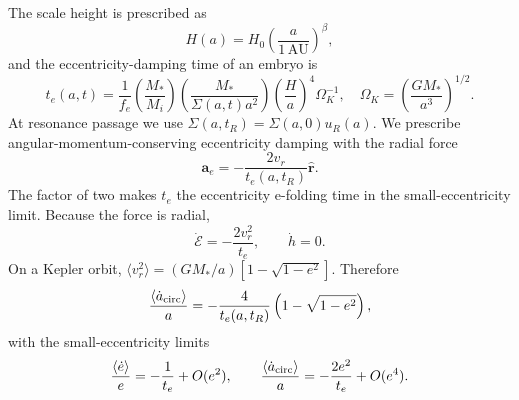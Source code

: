 The scale height is prescribed as
\begin{equation}
    H(a)=H_0\left(\frac{a}{1\,\mathrm{AU}}\right)^\beta,
\end{equation}
and the eccentricity-damping time of an embryo is
\begin{equation}
    t_e(a,t)=\frac{1}{f_e}
    \left(\frac{M_*}{M_i}\right)
    \left(\frac{M_*}{\Sigma(a,t)a^2}\right)
    \left(\frac{H}{a}\right)^4\Omega_K^{-1},
    \quad
    \Omega_K=\left(\frac{GM_*}{a^3}\right)^{1/2}.
\label{eq:type1_damping_time}
\end{equation}
At resonance passage we use $\Sigma(a,t_R)=\Sigma(a,0)u_R(a)$. We prescribe
angular-momentum-conserving eccentricity damping with the radial force
\begin{equation}
    \mathbf a_e=-\frac{2v_r}{t_e(a,t_R)}\hat{\mathbf r}.
\label{eq:radial_eccentricity_damping_force}
\end{equation}
The factor of two makes $t_e$ the eccentricity e-folding time in the
small-eccentricity limit. Because the force is radial,
\begin{equation}
    \dot{\mathcal E}=-\frac{2v_r^2}{t_e},
    \qquad \dot h=0.
\label{eq:damping_energy_angular_momentum}
\end{equation}
On a Kepler orbit,
$\langle v_r^2\rangle=(GM_*/a)[1-\sqrt{1-e^2}]$. Therefore
\begin{equation}
    \frac{\left\langle\dot a_{\rm circ}\right\rangle}{a}
    =-\frac{4}{t_e(a,t_R)}\left(1-\sqrt{1-e^2}\right),
\label{eq:circularization_speed}
\end{equation}
with the small-eccentricity limits
\begin{equation}
    \frac{\langle\dot e\rangle}{e}=-\frac{1}{t_e}+O(e^2),
    \qquad
    \frac{\langle\dot a_{\rm circ}\rangle}{a}
    =-\frac{2e^2}{t_e}+O(e^4).
\label{eq:radial_damping_orbit_average}
\end{equation}

